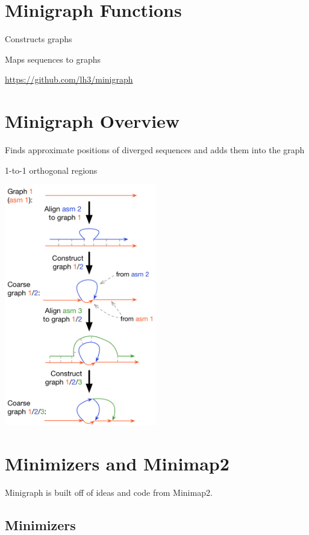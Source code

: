 \documentclass[
]{book}
\begin{document}
\hypertarget{minigraph-functions}{%
\section{Minigraph Functions}\label{minigraph-functions}}

Constructs graphs

Maps sequences to graphs

\url{https://github.com/lh3/minigraph}

\hypertarget{minigraph-overview}{%
\section{Minigraph Overview}\label{minigraph-overview}}

Finds approximate positions of diverged sequences and adds them into the graph

1-to-1 orthogonal regions

\includegraphics[width=0.5\textwidth,height=\textheight]{./Figures/Minigraph.png}

\hypertarget{minimizers-and-minimap2}{%
\section{Minimizers and Minimap2}\label{minimizers-and-minimap2}}

Minigraph is built off of ideas and code from Minimap2.

\hypertarget{minimizers}{%
\subsection*{Minimizers}\label{minimizers}}
\end{document}
